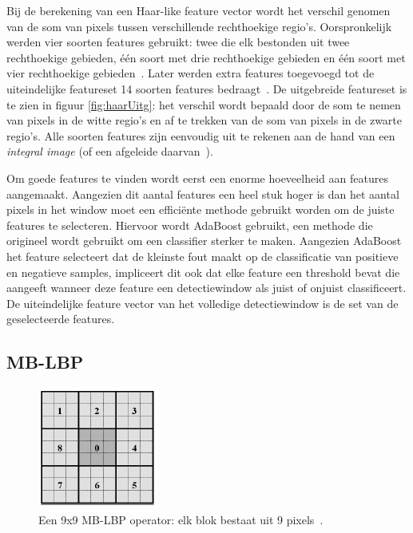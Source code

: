 Bij de berekening van een Haar-like feature vector wordt het verschil genomen van de som van pixels tussen verschillende rechthoekige regio's. Oorspronkelijk werden vier soorten features gebruikt: twee die elk bestonden uit twee rechthoekige gebieden, \'e\'en soort met drie rechthoekige gebieden en \'e\'en soort met vier rechthoekige gebieden~\cite{viola2001rapid}. Later werden extra features toegevoegd tot de uiteindelijke featureset 14 soorten features bedraagt~\cite{lienhart2002extended}. De uitgebreide featureset is te zien in figuur \ref{fig:haarUitg}: het verschil wordt bepaald door de som te nemen van pixels in de witte regio's en af te trekken van de som van pixels in de zwarte regio's. Alle soorten features zijn eenvoudig uit te rekenen aan de hand van een \textit{integral image} (of een afgeleide daarvan~\cite{lienhart2002extended}).

Om goede features te vinden wordt eerst een enorme hoeveelheid aan features aangemaakt. Aangezien dit aantal features een heel stuk hoger is dan het aantal pixels in het window moet een effici\"ente methode gebruikt worden om de juiste features te selecteren. Hiervoor wordt AdaBoost gebruikt, een methode die origineel wordt gebruikt om een classifier sterker te maken. Aangezien AdaBoost het feature selecteert dat de kleinste fout maakt op de classificatie van positieve en negatieve samples, impliceert dit ook dat elke feature een threshold bevat die aangeeft wanneer deze feature een detectiewindow als juist of onjuist classificeert. De uiteindelijke feature vector van het volledige detectiewindow is de set van de geselecteerde features.

\subsection{MB-LBP} \label{sec:feat_mblbp}

\begin{figure}
  \centering
  \includegraphics[width=.3\linewidth]{img/lbp}
  \caption{Een 9x9 MB-LBP operator: elk blok bestaat uit 9 pixels~\cite{liao2007learning}.}
  \label{fig:lbp}
\end{figure}

